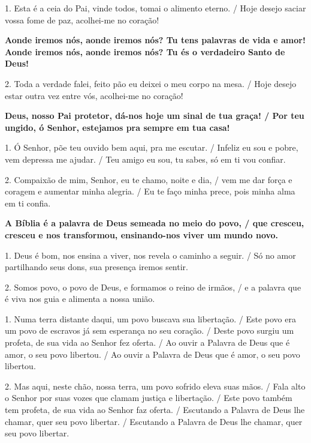 \documentclass[a5paper,9pt]{extarticle}
\begin{document}
\begin{cantos}
\begin{canto}
1. Esta é a ceia do Pai, vinde todos, tomai o alimento eterno. / Hoje desejo saciar vossa fome de paz, acolhei-me no coração!

\textbf{Aonde iremos nós, aonde iremos nós? Tu tens palavras de vida e amor! Aonde iremos nós, aonde iremos nós? Tu és o verdadeiro Santo de Deus!}

2. Toda a verdade falei, feito pão eu deixei o meu corpo na mesa. / Hoje desejo estar outra vez entre vós, acolhei-me no coração!
\end{canto}

\begin{canto}
\textbf{Deus, nosso Pai protetor, dá-nos hoje um sinal de tua graça! / Por teu ungido, ó Senhor, estejamos pra sempre em tua casa!}

1. Ó Senhor, põe teu ouvido bem aqui, pra me escutar. / Infeliz eu sou e pobre, vem depressa me ajudar. / Teu amigo eu sou, tu sabes, só em ti vou confiar.

2. Compaixão de mim, Senhor, eu te chamo, noite e dia, / vem me dar força e coragem e aumentar minha alegria. / Eu te faço minha prece, pois minha alma em ti confia.
\end{canto}

\begin{canto}
\textbf{A Bíblia é a palavra de Deus semeada no meio do povo, / que cresceu, cresceu e nos transformou, ensinando-nos viver um mundo novo.}

1. Deus é bom, nos ensina a viver, nos revela o caminho a seguir. / Só no amor partilhando seus dons, sua presença iremos sentir.

2. Somos povo, o povo de Deus, e formamos o reino de irmãos, / e a palavra que é viva nos guia e alimenta a nossa união.
\end{canto}

\begin{canto}
1. Numa terra distante daqui, um povo buscava sua libertação. / Este povo era um povo de escravos já sem esperança no seu coração. / Deste povo surgiu um profeta, de sua vida ao Senhor fez oferta. / Ao ouvir a Palavra de Deus que é amor, o seu povo libertou. / Ao ouvir a Palavra de Deus que é amor, o seu povo libertou.

2. Mas aqui, neste chão, nossa terra, um povo sofrido eleva suas mãos. / Fala alto o Senhor por suas vozes que clamam justiça e libertação. / Este povo também tem profeta, de sua vida ao Senhor faz oferta. / Escutando a Palavra de Deus lhe chamar, quer seu povo libertar. / Escutando a Palavra de Deus lhe chamar, quer seu povo libertar.
\end{canto}


\end{cantos}
\end{document}
